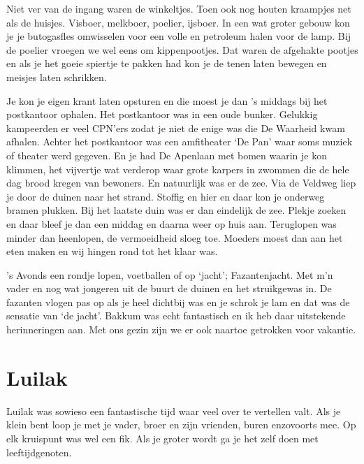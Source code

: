 \documentclass[12pt,twoside, openright]{memoir}
\begin{document}
Niet ver van de ingang waren de winkeltjes. Toen ook nog houten kraampjes net als de huisjes. Visboer, melkboer, poelier, ijsboer. In een wat groter gebouw kon je je butogasfles omwisselen voor een volle en petroleum halen voor de lamp. Bij de poelier vroegen we wel eens om kippenpootjes. Dat waren de afgehakte pootjes en als je het goeie spiertje te pakken had kon je de tenen laten bewegen en meisjes laten schrikken.

Je kon je eigen krant laten opsturen en die moest je dan ’s middags bij het postkantoor ophalen. Het postkantoor was in een oude bunker. Gelukkig kampeerden er veel CPN’ers zodat je niet de enige was die De Waarheid kwam afhalen. Achter het postkantoor was een amfitheater ‘De Pan’ waar soms muziek of theater werd gegeven. En je had De Apenlaan met bomen waarin je kon klimmen, het vijvertje wat verderop waar grote karpers in zwommen die de hele dag brood kregen van bewoners.
En natuurlijk was er de zee. Via de Veldweg liep je door de duinen naar het strand. Stoffig en hier en daar kon je onderweg bramen plukken. Bij het laatste duin was er dan eindelijk de zee. Plekje zoeken en daar bleef je dan een middag en daarna weer op huis aan. Teruglopen was minder dan heenlopen, de vermoeidheid sloeg toe. Moeders moest dan aan het eten maken en wij hingen rond tot het klaar was. 

’s Avonds een rondje lopen, voetballen of op ‘jacht’; Fazantenjacht. Met m’n vader en nog wat jongeren uit de buurt de duinen en het struikgewas in. De fazanten vlogen pas op als je heel dichtbij was en je schrok je lam en dat was de sensatie van ‘de jacht’.
Bakkum was echt fantastisch en ik heb daar uitstekende herinneringen aan. Met ons gezin zijn we er ook naartoe getrokken voor vakantie.

\section*{Luilak} %
\label{cha:luilak}

Luilak was sowieso een fantastische tijd waar veel over te vertellen valt. Als je klein bent loop je met je vader, broer en zijn vrienden, buren enzovoorts mee. Op elk kruispunt was wel een fik. Als je groter wordt ga je het zelf doen met leeftijdgenoten. 
\end{document}
